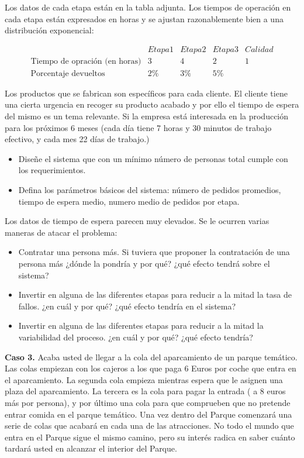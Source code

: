 \documentclass[
]{book}
\providecommand{\tightlist}{%
  \setlength{\itemsep}{0pt}\setlength{\parskip}{0pt}}
\theoremstyle{definition}
\theoremstyle{definition}
\theoremstyle{definition}
\theoremstyle{definition}
\theoremstyle{remark}
\begin{document}
Los datos de cada etapa están en la tabla adjunta. Los tiempos de operación en cada etapa están expresados en horas y se ajustan razonablemente bien a una distribución exponencial:

\[
\begin{matrix}
& Etapa 1 & Etapa 2 & Etapa 3 & Calidad\\
\text{Tiempo de opración (en horas)} & 3 & 4 & 2 & 1\\
\text{Porcentaje devueltos} & 2\% & 3\% & 5\% &
\end{matrix}
\]

Los productos que se fabrican son específicos para cada cliente. El cliente tiene una cierta urgencia en recoger su producto acabado y por ello el tiempo de espera del mismo es un tema relevante. Si la empresa está interesada en la producción para los próximos 6 meses (cada día tiene 7 horas y 30 minutos de trabajo efectivo, y cada mes 22 días de trabajo.)

\begin{itemize}
\tightlist
\item
  Diseñe el sistema que con un mínimo número de personas total cumple con los requerimientos.
\item
  Defina los parámetros básicos del sistema: número de pedidos promedios, tiempo de espera medio, numero medio de pedidos por etapa.
\end{itemize}

Los datos de tiempo de espera parecen muy elevados. Se le ocurren varias maneras de atacar el problema:

\begin{itemize}
\tightlist
\item
  Contratar una persona más. Si tuviera que proponer la contratación de una persona más ¿dónde la pondría y por qué? ¿qué efecto tendrá sobre el sistema?
\item
  Invertir en alguna de las diferentes etapas para reducir a la mitad la tasa de fallos. ¿en cuál y por qué? ¿qué efecto tendría en el sistema?
\item
  Invertir en alguna de las diferentes etapas para reducir a la mitad la variabilidad del proceso. ¿en cuál y por qué? ¿qué efecto tendría?
\end{itemize}

\textbf{Caso 3.} Acaba usted de llegar a la cola del aparcamiento de un parque temático. Las colas empiezan con los cajeros a los que paga 6 Euros por coche que entra en el aparcamiento. La segunda cola empieza mientras espera que le asignen una plaza del aparcamiento. La tercera es la cola para pagar la entrada ( a 8 euros más por persona), y por último una cola para que comprueben que no pretende entrar comida en el parque temático. Una vez dentro del Parque comenzará una serie de colas que acabará en cada una de las atracciones. No todo el mundo que entra en el Parque sigue el mismo camino, pero su interés radica en saber cuánto tardará usted en alcanzar el interior del Parque.
\end{document}
